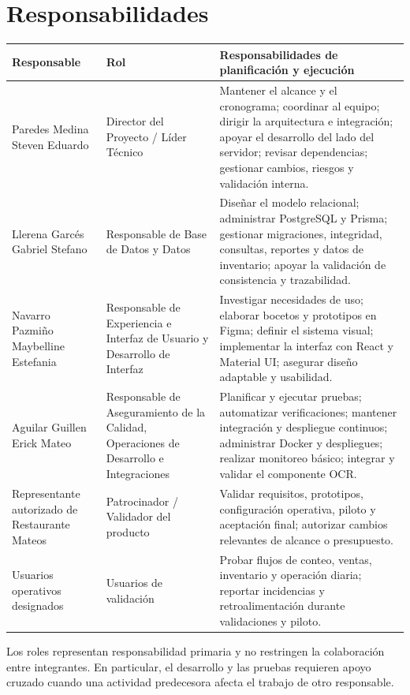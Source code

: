 \documentclass[12pt,a4paper]{article}
\begin{document}
\section{Responsabilidades}

\begin{longtable}{|p{4.6cm}|p{4.2cm}|p{6.5cm}|}
\hline
\rowcolor{tableheader}
\textbf{Responsable} & \textbf{Rol} & \textbf{Responsabilidades de planificación y ejecución} \\ \hline
Paredes Medina Steven Eduardo & Director del Proyecto / Líder Técnico & Mantener el alcance y el cronograma; coordinar al equipo; dirigir la arquitectura e integración; apoyar el desarrollo del lado del servidor; revisar dependencias; gestionar cambios, riesgos y validación interna. \\ \hline
Llerena Garcés Gabriel Stefano & Responsable de Base de Datos y Datos & Diseñar el modelo relacional; administrar PostgreSQL y Prisma; gestionar migraciones, integridad, consultas, reportes y datos de inventario; apoyar la validación de consistencia y trazabilidad. \\ \hline
Navarro Pazmiño Maybelline Estefania & Responsable de Experiencia e Interfaz de Usuario y Desarrollo de Interfaz & Investigar necesidades de uso; elaborar bocetos y prototipos en Figma; definir el sistema visual; implementar la interfaz con React y Material UI; asegurar diseño adaptable y usabilidad. \\ \hline
Aguilar Guillen Erick Mateo & Responsable de Aseguramiento de la Calidad, Operaciones de Desarrollo e Integraciones & Planificar y ejecutar pruebas; automatizar verificaciones; mantener integración y despliegue continuos; administrar Docker y despliegues; realizar monitoreo básico; integrar y validar el componente OCR. \\ \hline
Representante autorizado de Restaurante Mateos & Patrocinador / Validador del producto & Validar requisitos, prototipos, configuración operativa, piloto y aceptación final; autorizar cambios relevantes de alcance o presupuesto. \\ \hline
Usuarios operativos designados & Usuarios de validación & Probar flujos de conteo, ventas, inventario y operación diaria; reportar incidencias y retroalimentación durante validaciones y piloto. \\ \hline
\end{longtable}

Los roles representan responsabilidad primaria y no restringen la colaboración entre integrantes. En particular, el desarrollo y las pruebas requieren apoyo cruzado cuando una actividad predecesora afecta el trabajo de otro responsable.
\end{document}
